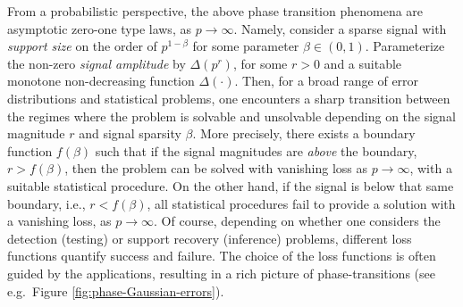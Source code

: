 From a probabilistic perspective, the above phase transition phenomena are asymptotic zero-one type laws, as $p\to\infty$.  
Namely, consider a sparse signal with  {\em support size} on the order of $p^{1-\beta}$ for some parameter $\beta\in (0,1)$.  
Parameterize the non-zero {\em signal amplitude} by $\Delta(p^r)$, 
for some $r>0$ and a suitable monotone non-decreasing function $\Delta(\cdot)$.  Then, for a broad range of error distributions and
statistical problems, one encounters a sharp transition between the regimes where the problem is solvable and unsolvable depending on 
the signal magnitude $r$ and signal sparsity $\beta$.  More precisely, there exists a boundary function $f(\beta)$ such that if 
the signal magnitudes are {\em above} the boundary, $r> f(\beta)$, then the problem can be solved with vanishing loss as $p\to\infty$, with a suitable statistical procedure.  On the other hand, if the signal is below that same boundary, i.e., $r<f(\beta)$, all statistical procedures fail to  provide a solution with a vanishing loss, as $p\to\infty$. Of course, depending on whether one considers the  detection (testing) or 
support recovery (inference) problems, different loss functions quantify success and failure. The choice of the loss functions is often guided by the 
applications, resulting in a rich picture of phase-transitions (see e.g.\ Figure \ref{fig:phase-Gaussian-errors}).

